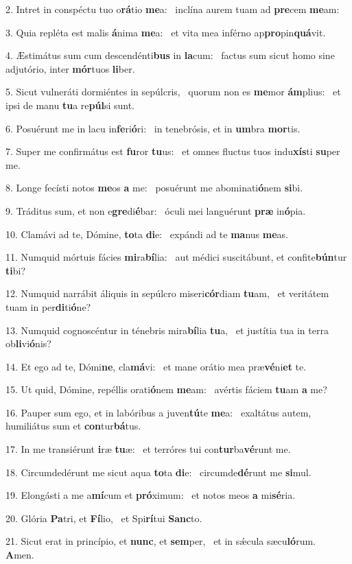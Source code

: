 2. Intret in conspéctu tuo o\textbf{rá}tio \textbf{me}a: \ast\  inclína aurem tuam ad \textbf{pre}cem \textbf{me}am:\

3. Quia repléta est malis \textbf{á}nima \textbf{me}a: \ast\  et vita mea inférno ap\textbf{pro}pin\textbf{quá}vit.\

4. Æstimátus sum cum descendénti\textbf{bus} in \textbf{la}cum: \ast\  factus sum sicut homo sine adjutório, inter \textbf{mór}tuos \textbf{li}ber.\

5. Sicut vulneráti dormiéntes in sepúlcris, \dag\  quorum non es \textbf{me}mor \textbf{ám}plius: \ast\  et ipsi de manu \textbf{tu}a re\textbf{púl}si sunt.\

6. Posuérunt me in lacu in\textbf{fe}ri\textbf{ó}ri: \ast\  in tenebrósis, et in \textbf{um}bra \textbf{mor}tis.\

7. Super me confirmátus est \textbf{fu}ror \textbf{tu}us: \ast\  et omnes fluctus tuos indu\textbf{xís}ti \textbf{su}per me.\

8. Longe fecísti notos \textbf{me}os \textbf{a} me: \ast\  posuérunt me abominati\textbf{ó}nem \textbf{si}bi.\

9. Tráditus sum, et non e\textbf{gre}di\textbf{é}bar: \ast\  óculi mei languérunt \textbf{præ} in\textbf{ó}pia.\

10. Clamávi ad te, Dómine, \textbf{to}ta \textbf{di}e: \ast\  expándi ad te \textbf{ma}nus \textbf{me}as.\

11. Numquid mórtuis fácies \textbf{mi}ra\textbf{bí}lia: \ast\  aut médici suscitábunt, et confite\textbf{bún}tur \textbf{ti}bi?\

12. Numquid narrábit áliquis in sepúlcro miseri\textbf{cór}diam \textbf{tu}am, \ast\  et veritátem tuam in per\textbf{di}ti\textbf{ó}ne?\

13. Numquid cognoscéntur in ténebris mira\textbf{bí}lia \textbf{tu}a, \ast\  et justítia tua in terra ob\textbf{li}vi\textbf{ó}nis?\

14. Et ego ad te, Dómi\textbf{ne}, cla\textbf{má}vi: \ast\  et mane orátio mea præ\textbf{vé}ni\textbf{et} te.\

15. Ut quid, Dómine, repéllis orati\textbf{ó}nem \textbf{me}am: \ast\  avértis fáciem \textbf{tu}am \textbf{a} me?\

16. Pauper sum ego, et in labóribus a juven\textbf{tú}te \textbf{me}a: \ast\  exaltátus autem, humiliátus sum et \textbf{con}tur\textbf{bá}tus.\

17. In me transiérunt \textbf{i}ræ \textbf{tu}æ: \ast\  et terróres tui con\textbf{tur}ba\textbf{vé}runt me.\

18. Circumdedérunt me sicut aqua \textbf{to}ta \textbf{di}e: \ast\  circumde\textbf{dé}runt me \textbf{si}mul.\

19. Elongásti a me a\textbf{mí}cum et \textbf{pró}ximum: \ast\  et notos meos \textbf{a} mi\textbf{sé}ria.\

20. Glória \textbf{Pa}tri, et \textbf{Fí}lio, \ast\  et Spi\textbf{rí}tui \textbf{Sanc}to.\

21. Sicut erat in princípio, et \textbf{nunc}, et \textbf{sem}per, \ast\  et in sǽcula sæcu\textbf{ló}rum. \textbf{A}men.\

